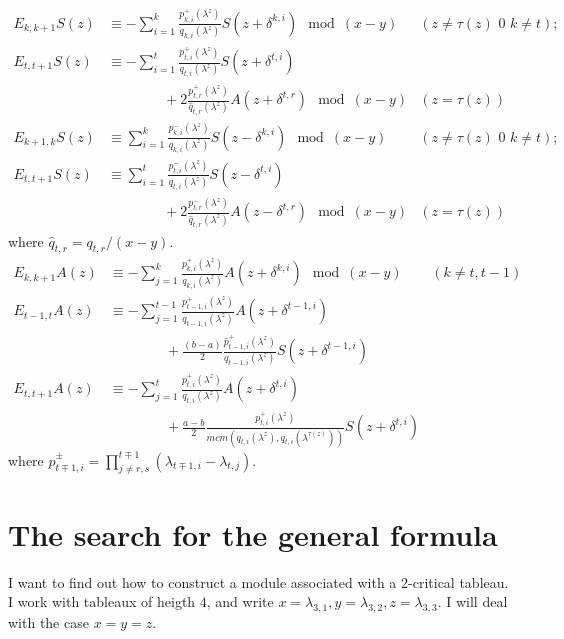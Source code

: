 \documentclass[11pt,fleqn]{article}
\begin{document}
\begin{align*}
E_{k,k+1} S(z)
	&\equiv -\sum_{i=1}^k \frac{p_{k,i}^+(\lambda^z)}{q_{k,i}(\lambda^z)} 
	S(z+\delta^{k,i}) \mod (x-y) &(z \neq \tau(z) \mbox{ 0 } k \neq t); \\
E_{t,t+1} S(z)
	&\equiv -\sum_{i=1}^t \frac{p_{t,i}^+(\lambda^z)}{q_{t,i}(\lambda^z)} 
	S(z+\delta^{t,i}) \\&\qquad \qquad + 2\frac{p^+_{t,r}(\lambda^z)}{\hat q_{t,r}(\lambda^z)} A(z+\delta^{t,r}) \mod (x-y) &(z = \tau(z)) \\
E_{k+1,k} S(z)
	&\equiv \sum_{i=1}^k \frac{p_{k,i}^-(\lambda^z)}{q_{k,i}(\lambda^z)} 
	S(z-\delta^{k,i}) \mod (x-y) &(z \neq \tau(z) \mbox{ 0 } k \neq t); \\
E_{t,t+1} S(z)
	&\equiv \sum_{i=1}^t \frac{p_{t,i}^-(\lambda^z)}{q_{t,i}(\lambda^z)} 
	S(z-\delta^{t,i}) \\&\qquad \qquad + 2\frac{p^-_{t,r}(\lambda^z)}{\hat q_{t,r}(\lambda^z)} A(z-\delta^{t,r}) \mod (x-y) &(z = \tau(z))
\end{align*}
where $\hat q_{t,r} = q_{t,r}/(x-y)$.
\begin{align*}
E_{k,k+1} A(z)
	&\equiv -\sum_{j=1}^k \frac{p_{k,i}^+(\lambda^z)}{q_{k,i}(\lambda^z)}
	A(z+\delta^{k,i}) \mod (x-y)&(k \neq t,t-1) \\
E_{t-1,t} A(z) 
	&\equiv -\sum_{j=1}^{t-1} \frac{p_{t-1,i}^+(\lambda^z)}
	{q_{t-1,i}(\lambda^z)} A(z+\delta^{t-1,i}) \\
	&\qquad \qquad + \frac{(b-a)}{2}\frac{\hat p^+_{t-1,i}(\lambda^z)}
	{q_{t-1,i}(\lambda^z)} S(z + \delta^{t-1,i})\\
E_{t,t+1} A(z)
	&\equiv -\sum_{j=1}^{t} \frac{p_{t,i}^+(\lambda^z)}
	{q_{t,i}(\lambda^z)} A(z+\delta^{t,i}) \\
	&\qquad \qquad + \frac{a-b}{2} \frac{p_{t,i}^+(\lambda^z)}
	{mcm(q_{t,i}(\lambda^z),q_{t,i}(\lambda^{\tau(z)}))} S(z + \delta^{t,i})
\end{align*}
where $\displaystyle \hat p_{t \mp 1,i}^\pm = \prod_{j \neq r,s}^{t\mp 1} 
(\lambda_{t\mp 1, i} - \lambda_{t,j})$.


\newpage

\section{The search for the general formula}

I want to find out how to construct a module associated with a $2$-critical
tableau. I work with tableaux of heigth $4$, and write $x = \lambda_{3,1}, y 
= \lambda_{3,2}, z = \lambda_{3,3}$. I will deal with the case $x = y = z$.
\end{document}
